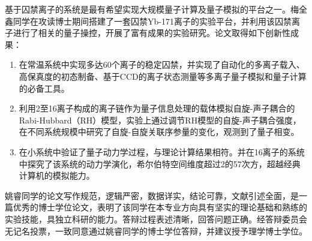 
\begin{resolution}

  基于囚禁离子的系统是最有希望实现大规模量子计算及量子模拟的平台之一。梅全鑫同学在攻读博士期间搭建了一套囚禁Yb-171离子的实验平台，并利用该囚禁离子进行了相关的量子操控，开展了富有成果的实验研究。论文取得如下创新性成果：
  \begin{enumerate}
    \item 在常温系统中实现多达60个离子的稳定囚禁，并实现了自动化的多离子载入、高保真度的初态制备、基于CCD的离子状态测量等多离子量子模拟和量子计算的必备工具。
    \item 利用2至16离子构成的离子链作为量子信息处理的载体模拟自旋-声子耦合的Rabi-Hubbard（RH）模型，实验上通过调节RH模型的自旋-声子耦合强度，在不同系统规模中研究了自旋-自旋关联序参量的变化，观测到了量子相变。
    \item 在小系统中验证了量子动力学过程，与理论计算结果相符。并在16离子的系统中探究了该系统的动力学演化，希尔伯特空间维度超过2的57次方，超越经典计算机的模拟能力。
  \end{enumerate}


  姚睿同学的论文写作规范，逻辑严密，数据详实，结论可靠，文献引述全面，是一篇优秀的博士学位论文，表明了该同学在本专业方向具有坚实的理论基础和熟练的实验技能，具独立科研的能力。答辩过程表述清晰，回答问题正确。经答辩委员会无记名投票，一致同意通过姚睿同学的博士学位答辩，并建议授予理学博士学位。



\end{resolution}
